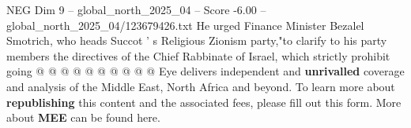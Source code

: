 \begin{textsample}{NEG Dim 9 – global\_north\_2025\_04 – Score -6.00 – global\_north\_2025\_04/123679426.txt}
He urged Finance Minister Bezalel Smotrich, who heads Succot ' s Religious Zionism party,"to clarify to his party members the directives of the Chief Rabbinate of Israel, which strictly prohibit going @ @ @ @ @ @ @ @ @ @ Eye delivers independent and \textbf{unrivalled} coverage and analysis of the Middle East, North Africa and beyond.
To learn more about \textbf{republishing} this content and the associated fees, please fill out this form.
More about \textbf{MEE} can be found here.

\end{textsample}
